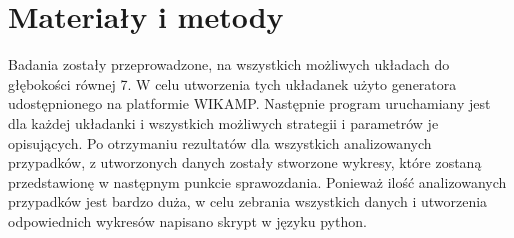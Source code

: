 \documentclass{classrep}
\begin{document}
\section{Materiały i metody}
{Badania zostały przeprowadzone, na wszystkich możliwych układach do głębokości równej 7. W celu utworzenia tych układanek użyto generatora udostępnionego na platformie WIKAMP.
Następnie program uruchamiany jest dla każdej układanki i wszystkich możliwych strategii i parametrów je opisujących. Po otrzymaniu rezultatów dla wszystkich analizowanych przypadków, z utworzonych danych zostały stworzone wykresy, które zostaną przedstawionę w następnym punkcie sprawozdania. Ponieważ ilość analizowanych przypadków jest bardzo duża, w celu zebrania wszystkich danych i utworzenia odpowiednich wykresów napisano skrypt w języku python.}

\newpage
\end{document}
